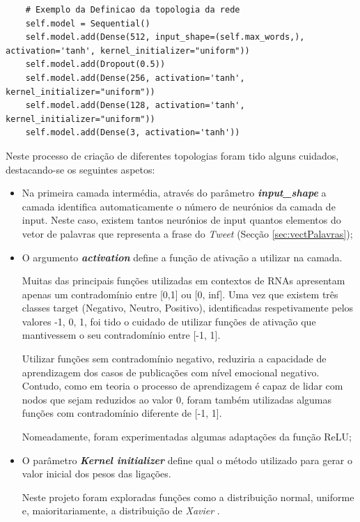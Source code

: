 \begin{verbatim} 
    # Exemplo da Definicao da topologia da rede
    self.model = Sequential()
    self.model.add(Dense(512, input_shape=(self.max_words,), activation='tanh', kernel_initializer="uniform"))
    self.model.add(Dropout(0.5))
    self.model.add(Dense(256, activation='tanh', kernel_initializer="uniform"))
    self.model.add(Dense(128, activation='tanh', kernel_initializer="uniform"))
    self.model.add(Dense(3, activation='tanh'))
\end{verbatim}

Neste processo de criação de diferentes topologias foram tido alguns cuidados, destacando-se os seguintes aspetos: 

\begin{itemize}
    \item Na primeira camada intermédia, através do parâmetro \textbf{\textit{input\_shape}} a camada identifica automaticamente o número de neurónios da camada de input. 
    Neste caso, existem tantos neurónios de input quantos elementos do vetor de palavras que representa a frase do \textit{Tweet} (Secção \ref{sec:vectPalavras});
    
    \item O argumento \textbf{\textit{activation}} define a função de ativação a utilizar na camada. 

    Muitas das principais funções utilizadas em contextos de RNAs apresentam apenas um contradomínio entre [0,1] ou [0, inf].
    Uma vez que existem três classes target ({Negativo, Neutro, Positivo}), identificadas respetivamente pelos valores {-1, 0, 1}, foi tido o cuidado de utilizar funções de ativação que mantivessem o seu contradomínio entre [-1, 1]. 
    
    Utilizar funções sem contradomínio negativo, reduziria a capacidade de aprendizagem dos casos de publicações com nível emocional negativo. 
    Contudo, como em teoria o processo de aprendizagem é capaz de lidar com nodos que sejam reduzidos ao valor 0, foram também utilizadas algumas funções com contradomínio diferente de [-1, 1]. 
    
    Nomeadamente, foram experimentadas algumas adaptações da função ReLU;
    
    \item O parâmetro \textbf{\textit{Kernel initializer}} define qual o método utilizado para gerar o valor inicial dos pesos das ligações. 
    
    Neste projeto foram exploradas funções como a distribuição normal, uniforme e, maioritariamente, a distribuição de \textit{Xavier} \cite{xavier}.
    

\end{itemize}
